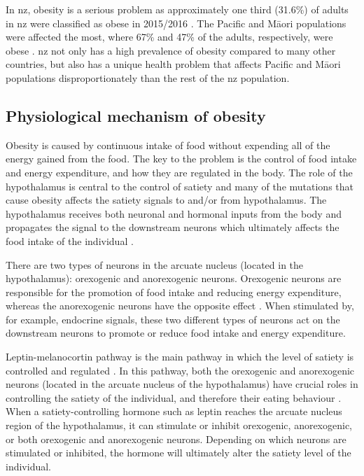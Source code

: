 In \gls{nz}, obesity is a serious problem as approximately one third (31.6\%) of adults in \gls{nz} were classified as obese in 2015/2016 \citep{Health2016}.
The Pacific and M\=aori populations were affected the most, where 67\% and 47\% of the adults, respectively, were obese \citep{Health2016}.
\gls{nz} not only has a high prevalence of obesity compared to many other countries, but also has a unique health problem that affects Pacific and M\=aori populations disproportionately than the rest of the \gls{nz} population.

\subsection{Physiological mechanism of obesity}
\label{sub:physiological_mechanism_of_obesity}

Obesity is caused by continuous intake of food without expending all of the energy gained from the food.
The key to the problem is the control of food intake and energy expenditure, and how they are regulated in the body.
The role of the hypothalamus is central to the control of satiety and many of the mutations that cause obesity affects the satiety signals to and/or from hypothalamus.
The hypothalamus receives both neuronal and hormonal inputs from the body and propagates the signal to the downstream neurons which ultimately affects the food intake of the individual \citep{Bell2005, Spiegelman2001}.

There are two types of neurons in the arcuate nucleus (located in the hypothalamus): orexogenic and anorexogenic neurons.
Orexogenic neurons are responsible for the promotion of food intake and reducing energy expenditure, whereas the anorexogenic neurons have the opposite effect \citep{Barsh2002}.
When stimulated by, for example, endocrine signals, these two different types of neurons act on the downstream neurons to promote or reduce food intake and energy expenditure.

Leptin-melanocortin pathway is the main pathway in which the level of satiety is controlled and regulated \citep{Spiegelman2001}.
In this pathway, both the orexogenic and anorexogenic neurons (located in the arcuate nucleus of the hypothalamus) have crucial roles in controlling the satiety of the individual, and therefore their eating behaviour \citep{Barsh2002,Bell2005}.
When a satiety-controlling hormone such as leptin reaches the arcuate nucleus region of the hypothalamus, it can stimulate or inhibit orexogenic, anorexogenic, or both orexogenic and anorexogenic neurons.
Depending on which neurons are stimulated or inhibited, the hormone will ultimately alter the satiety level of the individual.

